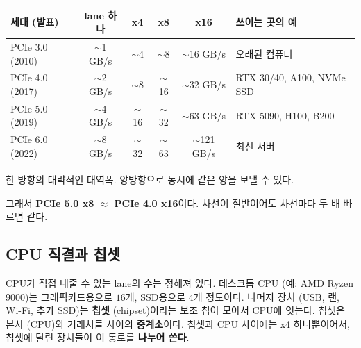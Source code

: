 \documentclass[11pt,a4paper]{article}
\begin{document}
\begin{center}
{\small
\begin{tabular}{@{}lccccl@{}}
\toprule
세대 (발표) & lane 하나 & x4 & x8 & x16 & 쓰이는 곳의 예 \\
\midrule
PCIe 3.0 (2010) & $\sim$1 GB/s & $\sim$4 & $\sim$8 & $\sim$16 GB/s & 오래된 컴퓨터 \\
PCIe 4.0 (2017) & $\sim$2 GB/s & $\sim$8 & $\sim$16 & $\sim$32 GB/s & RTX 30/40, A100, NVMe SSD \\
PCIe 5.0 (2019) & $\sim$4 GB/s & $\sim$16 & $\sim$32 & $\sim$63 GB/s & RTX 5090, H100, B200 \\
PCIe 6.0 (2022) & $\sim$8 GB/s & $\sim$32 & $\sim$63 & $\sim$121 GB/s & 최신 서버 \\
\bottomrule
\end{tabular}}

\small 한 방향의 대략적인 대역폭. 양방향으로 동시에 같은 양을 보낼 수 있다.
\end{center}

그래서 \textbf{PCIe 5.0 x8 $\approx$ PCIe 4.0 x16}이다. 차선이 절반이어도 차선마다 두 배 빠르면 같다.

\subsection{CPU 직결과 칩셋}\label{sec:chipset}

CPU가 직접 내줄 수 있는 lane의 수는 정해져 있다. 데스크톱 CPU (예: AMD Ryzen 9000)는 그래픽카드용으로 $16$개, SSD용으로 $4$개 정도이다.
나머지 장치 (USB, 랜, Wi-Fi, 추가 SSD)는 \textbf{칩셋} (chipset)이라는 보조 칩이 모아서 CPU에 잇는다.
칩셋은 본사 (CPU)와 거래처들 사이의 \textbf{중계소}이다. 칩셋과 CPU 사이에는 x4 하나뿐이어서, 칩셋에 달린 장치들이 이 통로를 \textbf{나누어 쓴다}.
\end{document}
